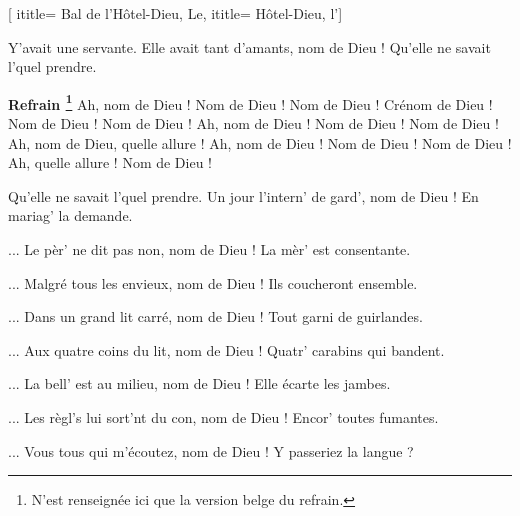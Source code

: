 [
ititle= {Bal de l'Hôtel-Dieu, Le},
ititle= {Hôtel-Dieu, l'}]


\beginverse
{} {Y'avait une servante.} 
Elle avait tant d'amants, nom de Dieu !
Qu'elle ne savait l'quel prendre.
\endverse

\beginchorus
\textbf {Refrain \footnote{N'est renseignée ici que la version belge du refrain.}}
Ah, nom de Dieu ! Nom de Dieu ! Nom de Dieu !
Crénom de Dieu ! Nom de Dieu ! Nom de Dieu !
Ah, nom de Dieu ! Nom de Dieu ! Nom de Dieu !
Ah, nom de Dieu, quelle allure !
Ah, nom de Dieu ! Nom de Dieu ! Nom de Dieu !
Ah, quelle allure ! Nom de Dieu !
\endchorus

\beginverse
{} {Qu'elle ne savait l'quel prendre.}
Un jour l'intern' de gard', nom de Dieu !
En mariag' la demande.
\endverse

\beginverse
... Le pèr' ne dit pas non, nom de Dieu !
La mèr' est consentante.
\endverse

\beginverse
... Malgré tous les envieux, nom de Dieu !
Ils coucheront ensemble.
\endverse

\beginverse
... Dans un grand lit carré, nom de Dieu !
Tout garni de guirlandes.
\endverse

\beginverse
... Aux quatre coins du lit, nom de Dieu !
Quatr' carabins qui bandent.
\endverse

\beginverse
... La bell' est au milieu, nom de Dieu !
Elle écarte les jambes.
\endverse

\beginverse
... Les règl's lui sort'nt du con, nom de Dieu !
Encor' toutes fumantes.
\endverse

\beginverse
... Vous tous qui m'écoutez, nom de Dieu !
Y passeriez la langue ?
\endverse

\endsong
